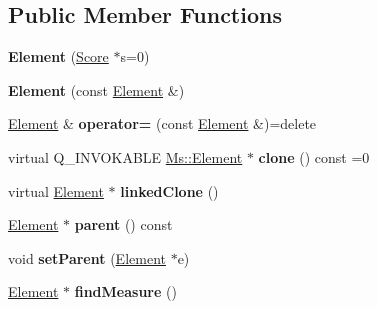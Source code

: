 \subsection*{Public Member Functions}
\begin{DoxyCompactItemize}
\item 
\mbox{\label{class_ms_1_1_element_aef368799f5d05abeada68f329a75a836}} 
{\bfseries Element} (\hyperlink{class_ms_1_1_score}{Score} $\ast$s=0)
\item 
\mbox{\label{class_ms_1_1_element_acd09fb62181874c199be863980a23328}} 
{\bfseries Element} (const \hyperlink{class_ms_1_1_element}{Element} \&)
\item 
\mbox{\label{class_ms_1_1_element_a77e9d09289e5df2742e8b80c18e6fe14}} 
\hyperlink{class_ms_1_1_element}{Element} \& {\bfseries operator=} (const \hyperlink{class_ms_1_1_element}{Element} \&)=delete
\item 
\mbox{\label{class_ms_1_1_element_adcd981af2ae9890f31c993050d5f0f25}} 
virtual Q\+\_\+\+I\+N\+V\+O\+K\+A\+B\+LE \hyperlink{class_ms_1_1_element}{Ms\+::\+Element} $\ast$ {\bfseries clone} () const =0
\item 
\mbox{\label{class_ms_1_1_element_ab6aade6de785c3ad52c1ed1dadcfcd9f}} 
virtual \hyperlink{class_ms_1_1_element}{Element} $\ast$ {\bfseries linked\+Clone} ()
\item 
\mbox{\label{class_ms_1_1_element_a52b30fdd589beba5b760a561a50ac601}} 
\hyperlink{class_ms_1_1_element}{Element} $\ast$ {\bfseries parent} () const
\item 
\mbox{\label{class_ms_1_1_element_aa7757f6d62dc28447706ee8eb12da5ec}} 
void {\bfseries set\+Parent} (\hyperlink{class_ms_1_1_element}{Element} $\ast$e)
\item 
\mbox{\label{class_ms_1_1_element_a9ce7e4cd657b83a9d6d4faf812c0d3a4}} 
\hyperlink{class_ms_1_1_element}{Element} $\ast$ {\bfseries find\+Measure} ()
\item 
\mbox{\label{class_ms_1_1_element_a9f375d79304c4cec5b45ea883c9efc86}} 

\end{DoxyCompactItemize}
